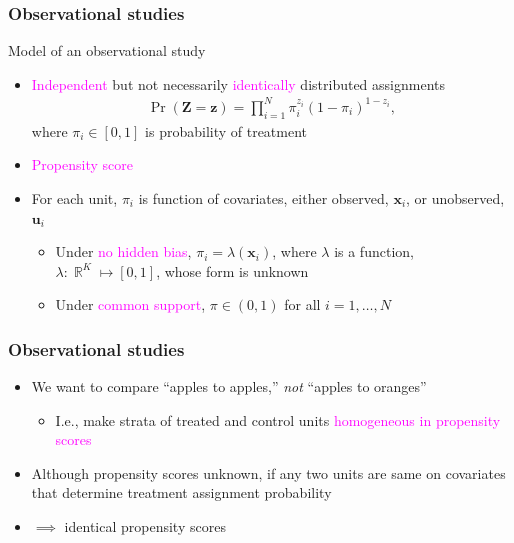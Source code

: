 \documentclass[table, xcolor = {dvipsnames}, 9pt]{beamer}
\theoremstyle{plain}
\DeclareMathOperator{\R}{\mathbb{R}}
\begin{document}
\begin{frame}[t]
\frametitle{Observational studies}
\vfill
Model of an observational study \citep{rosenbaum2002a} \vfill
\begin{itemize} \vfill
\item \textcolor{magenta}{Independent} but not necessarily \textcolor{magenta}{identically} distributed assignments \vfill
\begin{align} \label{eq: obs study mod}
\Pr\left(\bm{Z} = \bm{z}\right) = \prod \limits_{i = 1}^N \pi_i^{z_i} (1 - \pi_i)^{1 - z_i},
\end{align}
where $\pi_i \in [0, 1]$ is probability of treatment \vfill
\item \textcolor{magenta}{Propensity score} \vfill
\item For each unit, $\pi_i$ is function of covariates, either observed, $\bm{x}_i$, or unobserved, $\bm{u}_i$ \vfill
\begin{itemize} \vfill
\item Under \textcolor{magenta}{no hidden bias}, $\pi_i = \lambda(\bm{x}_i)$, where $\lambda$ is a function, $\lambda: \R^K \mapsto [0, 1]$, whose form is unknown \vfill
\item Under \textcolor{magenta}{common support}, $\pi \in (0, 1)$ for all $i = 1, \ldots , N$ \vfill
\end{itemize} \vfill
\end{itemize} \vfill
\end{frame}
\begin{frame}[t]
\frametitle{Observational studies}
\vfill
\begin{itemize} \vfill
\item We want to compare ``apples to apples,'' \textit{not} ``apples to oranges'' \\ \citep{rubinwaterman2006} \vfill
\begin{itemize} \vfill
\item I.e., make strata of treated and control units \textcolor{magenta}{homogeneous in propensity scores} \vfill
\end{itemize} \vfill
\item Although propensity scores unknown, if any two units are same on covariates that determine treatment assignment probability \vfill
\item[] $\implies$ identical propensity scores \vfill
\end{itemize} \vfill
\end{frame}
\end{document}
